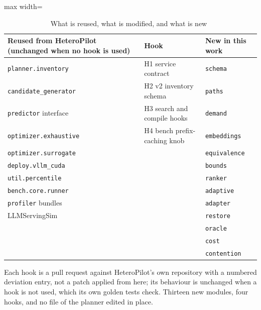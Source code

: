 \begin{table}[!t]
  \caption{What is reused, what is modified, and what is new~}
  \label{tab:reuse}
  \small
  \begin{adjustbox}{max width=\textwidth}
  \begin{tabular}{lll}
    \toprule
    Reused from HeteroPilot (unchanged when no hook is used) & Hook & New in this work \\
    \midrule
    \texttt{planner.inventory}      & H1 service contract& \texttt{schema} \\
    \texttt{candidate\_generator}   & H2 v2 inventory schema& \texttt{paths} \\
    \texttt{predictor} interface    & H3 search and compile hooks& \texttt{demand} \\
    \texttt{optimizer.exhaustive}   & H4 bench prefix-caching knob& \texttt{embeddings} \\
    \texttt{optimizer.surrogate}    &                  & \texttt{equivalence} \\
    \texttt{deploy.vllm\_cuda}      &                  & \texttt{bounds} \\
    \texttt{util.percentile}        &                  & \texttt{ranker} \\
    \texttt{bench.core.runner}      &                  & \texttt{adaptive} \\
    \texttt{profiler} bundles       &                  & \texttt{adapter} \\
    LLMServingSim                   &                  & \texttt{restore} \\
                                    &                  & \texttt{oracle} \\
                                    &                  & \texttt{cost} \\
                                    &                  & \texttt{contention} \\
    \bottomrule
  \end{tabular}
  \end{adjustbox}
  \par
  \vspace{2pt}
  \footnotesize Each hook is a pull request against HeteroPilot's own
  repository with a numbered deviation entry, not a patch applied from here;
  its behaviour is unchanged when a hook is not used, which its own
  golden tests check. Thirteen new modules, four hooks, and no file of the
  planner edited in place.
\end{table}
